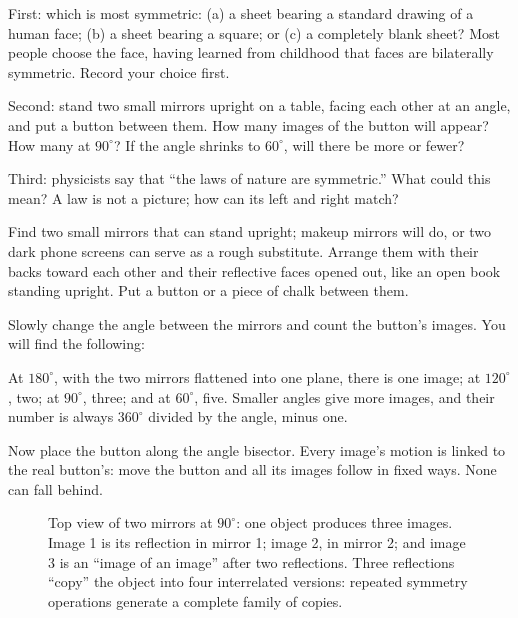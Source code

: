 First: which is most symmetric: (a) a sheet bearing a standard drawing of a human face; (b) a sheet bearing a square; or (c) a completely blank sheet? Most people choose the face, having learned from childhood that faces are bilaterally symmetric. Record your choice first.

Second: stand two small mirrors upright on a table, facing each other at an angle, and put a button between them. How many images of the button will appear? How many at \(90^\circ\)? If the angle shrinks to \(60^\circ\), will there be more or fewer?

Third: physicists say that ``the laws of nature are symmetric.'' What could this mean? A law is not a picture; how can its left and right match?


\begin{experiment}
Find two small mirrors that can stand upright; makeup mirrors will do, or two dark phone screens can serve as a rough substitute. Arrange them with their backs toward each other and their reflective faces opened out, like an open book standing upright. Put a button or a piece of chalk between them.

Slowly change the angle between the mirrors and count the button's images. You will find the following:

At \(180^\circ\), with the two mirrors flattened into one plane, there is one image; at \(120^\circ\), two; at \(90^\circ\), three; and at \(60^\circ\), five. Smaller angles give more images, and their number is always \(360^\circ\) divided by the angle, minus one.

Now place the button along the angle bisector. Every image's motion is linked to the real button's: move the button and all its images follow in fixed ways. None can fall behind.
\end{experiment}

\begin{figure}[htbp]
\centering
{}
\caption{Top view of two mirrors at \(90^\circ\): one object produces three images. Image 1 is its reflection in mirror 1; image 2, in mirror 2; and image 3 is an ``image of an image'' after two reflections. Three reflections ``copy'' the object into four interrelated versions: repeated symmetry operations generate a complete family of copies.}
\end{figure}

